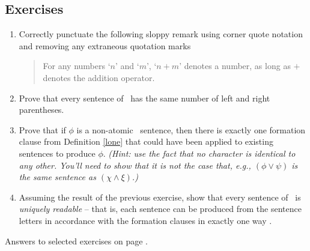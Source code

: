	
	{\small


\subsection*{Exercises} \label{ex3}


\begin{enumerate}
\item Correctly punctuate the following sloppy remark using corner quote notation and removing any extraneous quotation marks \begin{quote}
	For any numbers `$n$' and `$m$', `$n+m$' denotes a number, as long as $+$ denotes the addition operator.
\end{quote}
\item Prove that every sentence of \lone\ has the same number of left and right parentheses.
\item Prove that if $\phi$ is a non-atomic \lone\ sentence, then there is exactly one formation clause from Definition \ref{lone} that  could have been applied to existing sentences to produce $\phi$. \emph{(Hint: use the fact that no character is identical to any other. You'll need to show that it is not the case that, e.g., $(\phi \vee \psi)$ is the same sentence as $(\chi \wedge \xi)$.)}
\item Assuming the result of the previous exercise, show that every sentence of \lone\ is \emph{uniquely readable} – that is, each sentence can be produced from the sentence letters in accordance with the formation clauses in exactly one way \citep[\S 2]{sep-logic-classical}. 
	\end{enumerate}
	 
Answers to selected exercises on page \pageref{ans3}.
}


